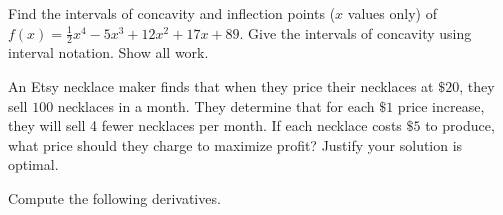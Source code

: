 \documentclass[addpoints,12pt]{exam}
\begin{document}
\begin{questions}
\newpage

\question[10] Find the intervals of concavity and inflection points ($x$ values only) of\\
$f(x)=\frac{1}{2}{x}^{4}-5{x}^{3}+12{x}^{2}+17x+89$. Give the intervals of concavity using
interval notation. Show all work.


\newpage




\question[12] An Etsy necklace maker finds that when they price their necklaces at $\$20 $, they
sell $100$ necklaces in a month. They determine that for each $\$1 $ price increase, they will
sell 4 fewer necklaces per month. If each necklace costs $\$5$ to produce, what price should
they charge to maximize profit? Justify your solution is optimal.

\newpage




\question



\newpage

\question Compute the following derivatives.

\begin{parts}


\end{parts}
\end{questions}
\end{document}
